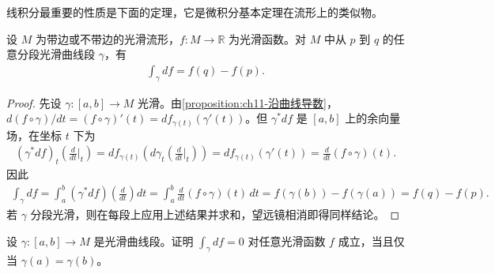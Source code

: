 \documentclass[../../main.tex]{subfiles}
\begin{document}
线积分最重要的性质是下面的定理，它是微积分基本定理在流形上的类似物。

\begin{theorem}[恰当余向量场的线积分]\label{theorem:ch11-恰当余向量场线积分}
设 $M$ 为带边或不带边的光滑流形，$f\colon M\to\mathbb{R}$ 为光滑函数。对 $M$ 中从 $p$ 到 $q$ 的任意分段光滑曲线段 $\gamma$，有
\begin{align}
\int_\gamma df=f(q)-f(p).\label{align:ch11-恰当线积分}
\end{align}
\end{theorem}

\begin{proof}
先设 $\gamma\colon[a,b]\to M$ 光滑。由\cref{proposition:ch11-沿曲线导数}，$d(f\circ\gamma)/dt=(f\circ\gamma)'(t)=df_{\gamma(t)}(\gamma'(t))$。但 $\gamma^*df$ 是 $[a,b]$ 上的余向量场，在坐标 $t$ 下为
\begin{align*}
(\gamma^*df)_t\left(\frac{d}{dt}\bigg|_t\right)=df_{\gamma(t)}\left(d\gamma_t\left(\frac{d}{dt}\bigg|_t\right)\right)=df_{\gamma(t)}(\gamma'(t))=\frac{d}{dt}(f\circ\gamma)(t).
\end{align*}
因此
\begin{align*}
\int_\gamma df=\int_a^b(\gamma^*df)\left(\frac{d}{dt}\right)dt=\int_a^b\frac{d}{dt}(f\circ\gamma)(t)\,dt=f(\gamma(b))-f(\gamma(a))=f(q)-f(p).
\end{align*}
若 $\gamma$ 分段光滑，则在每段上应用上述结果并求和，望远镜相消即得同样结论。
\end{proof}

\begin{exercise}\label{exercise:ch11-37}
设 $\gamma\colon[a,b]\to M$ 是光滑曲线段。证明 $\int_\gamma df=0$ 对任意光滑函数 $f$ 成立，当且仅当 $\gamma(a)=\gamma(b)$。
\end{exercise}
\end{document}
